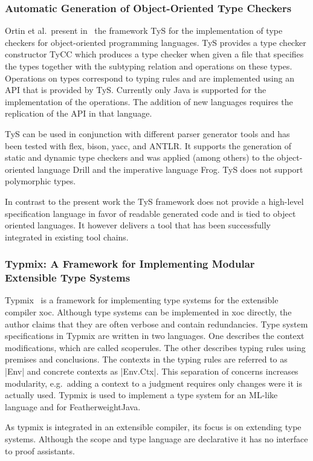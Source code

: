 \subsubsection{Automatic Generation of Object-Oriented Type Checkers}
Ortin et al.\ present in~\cite{ortin2014automatic} the framework TyS
for the implementation of type checkers for object-oriented
programming languages. TyS provides a type checker constructor TyCC
which produces a type checker when given a file that specifies the
types together with the subtyping relation and operations on these
types. Operations on types correspond to typing rules and are
implemented using an API that is provided by TyS. Currently only Java
is supported for the implementation of the operations. The addition of
new languages requires the replication of the API in that language.

TyS can be used in conjunction with different parser generator tools
and has been tested with flex, bison, yacc, and ANTLR. It supports
the generation of static and dynamic type checkers and was applied
(among others) to the object-oriented language Drill and the
imperative language Frog. TyS does not support polymorphic types.

In contrast to the present work the TyS framework does not provide a
high-level specification language in favor of readable generated code
and is tied to object oriented languages. It however delivers a tool
that has been successfully integrated in existing tool chains.
\subsubsection{Typmix: A Framework for Implementing Modular Extensible Type
  Systems}
Typmix~\cite{bergan2007typmix} is a framework for implementing type
systems for the extensible compiler xoc. Although type systems can be
implemented in xoc directly, the author claims that they are often
verbose and contain redundancies. Type system specifications in Typmix
are written in two languages. One describes the context modifications,
which are called scoperules. The other describes typing rules using
premises and conclusions. The contexts in the typing rules are
referred to as \code|Env| and concrete contexts as
\code|Env.Ctx|. This separation of concerns increases modularity,
e.g.\ adding a context to a judgment requires only changes were it is
actually used. Typmix is used to implement a type system for an
ML-like language and for FeatherweightJava.

As typmix is integrated in an extensible compiler, its focus is on
extending type systems. Although the scope and type language are
declarative it has no interface to proof assistants.

